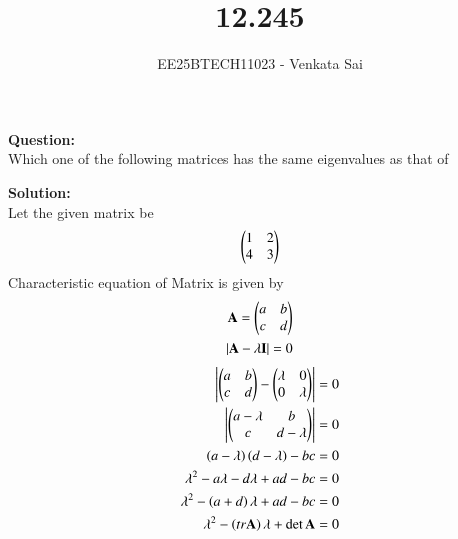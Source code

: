 \documentclass[journal]{IEEEtran}
\begin{document}


\title{12.245}
\author{EE25BTECH11023 - Venkata Sai}
\maketitle
\renewcommand{\thefigure}{\theenumi}
\renewcommand{\thetable}{\theenumi}
\setlength{\intextsep}{10pt} %

\renewcommand{\thetable}{\theenumi}

\textbf{Question:}  \\
Which one of the following matrices has the same eigenvalues as that of 
\begin{enumerate}
\begin{multicols}{4}
    \item {}
    \item {}
    \item {}
\item {}
\end{multicols}
\end{enumerate}
\textbf{Solution:}  \\
Let the given matrix be
\begin{align}
    \begin{pmatrix}1&2\\4&3\end{pmatrix}
\end{align}
Characteristic equation of Matrix is given by
\begin{align}
    \mathbf{A}=\begin{pmatrix}a&b\\c&d\end{pmatrix}\\
    |\mathbf{A}-\lambda\mathbf{I}|=0
    \end{align}
    \begin{align}
    \begin{vmatrix}\begin{pmatrix}a&b\\c&d\end{pmatrix}-\begin{pmatrix}\lambda&0 \\0&\lambda\end{pmatrix}\end{vmatrix}=0\\
    \begin{vmatrix}\begin{pmatrix}a-\lambda&b\\c&d-\lambda\end{pmatrix}\end{vmatrix}=0\\
    \left(a-\lambda\right)\left(d-\lambda\right)-bc=0\\
    \lambda^2-a\lambda-d\lambda+ad-bc=0  \\
    \lambda^2-\left(a+d\right)\lambda+ad-bc=0 \\
    \lambda^2-\left(tr\mathbf{A}\right)\lambda+\det{\mathbf{A}}=0
\end{align}
\end{document}
